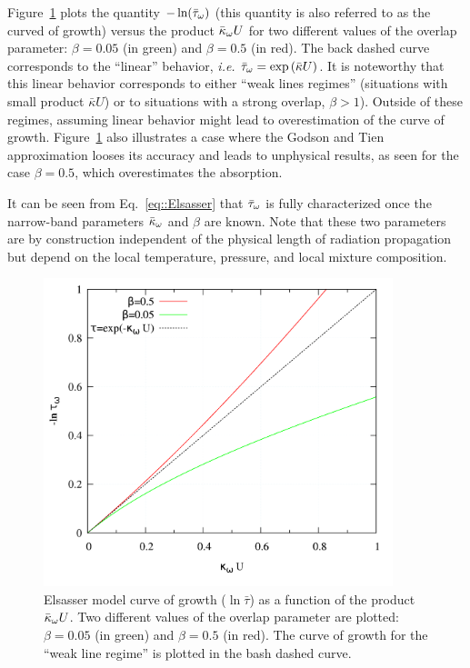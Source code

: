 Figure~\ref{fig::Elsasser_curve_growth} plots the quantity $-\ln(\bar{\tau}_{\omega})$ (this quantity is also referred to as the curved of growth) versus the product $\bar{\kappa}_{\omega} U$ for two different values of the overlap parameter: $\beta = 0.05$ (in green) and $\beta = 0.5$ (in red). The back dashed curve corresponds to the ``linear'' behavior, \textit{i.e.} $\bar{\tau}_{\omega} = \exp\left(\bar{\kappa} U\right)$. It is noteworthy that this linear behavior corresponds to either ``weak lines regimes'' (situations with small product $\bar{\kappa} U$) or to situations with a strong overlap, $\beta > 1$). Outside of these regimes, assuming linear behavior might lead to overestimation of the curve of growth. Figure~\ref{fig::Elsasser_curve_growth} also illustrates a case where the Godson and Tien approximation looses its accuracy and leads to unphysical results, as seen for the case $\beta=0.5$, which overestimates the absorption.

It can be seen from Eq.~\ref{eq::Elsasser} that $\bar{\tau}_{\omega}$ is fully characterized once the narrow-band parameters $\bar{\kappa}_{\omega}$ and $\beta$ are known. Note that these two parameters are by construction independent of the physical length of radiation propagation but depend on the local temperature, pressure, and local mixture composition.

\begin{figure}
\begin{center}
 \includegraphics[width=4.0in]{Figures/Elsasser_curve_of_growth.png}
\end{center}
 \caption{Elsasser model curve of growth ($\ln \bar{\tau}$) as a function of the product $\bar{\kappa}_{\omega} U$. Two different values of the overlap parameter are plotted: $\beta = 0.05$ (in green) and $\beta = 0.5$ (in red). The curve of growth for the ``weak line regime'' is plotted in the bash dashed curve.\label{fig::Elsasser_curve_growth}}
\end{figure}

